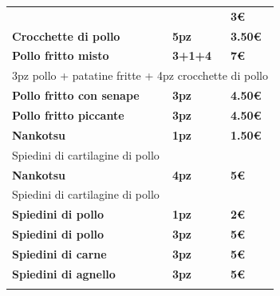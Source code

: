 \documentclass[hidelinks,10pt,a4paper]{article}
\newcommand{\mybox}[1]{
		\colorbox{square}{
		\begin{minipage}{0.97\linewidth}
			#1
		\end{minipage}
	}
}
\newcommand{\entryThreeDesc}[4]{
{\vspace*{-0.5mm}\textbf{\small{#1}}}&{\vspace*{-0.5mm}\textbf{\small{#3}}}&{\vspace*{-0.5mm}\textbf{\small{#4}}}\\
 \multicolumn{3}{l}{\textcolor{desc}{\footnotesize{#2}}} \\
}
\newcommand{\entryThreeSimple}[3]{
	{\textbf{\small{#1}}}&{\textbf{\small{#2}}}&{\textbf{\small{#3}}}\\
}
\begin{document}
\begin{landscape}
\begin{tabularx}{\linewidth}{XXX}
{			\mybox{
				\begin{tabular*}{\linewidth}{ l l l }
				\entryThreeSimple{Patatine fritte}{\hspace*{29mm}}{\hspace*{9mm}3€}
				\entryThreeSimple{Crocchette di pollo}{\hspace*{20mm}5pz}{\hspace*{9mm}3.50€}
				\entryThreeDesc{Pollo fritto misto }{3pz pollo + patatine fritte + 4pz crocchette di pollo}{\hspace*{20mm}3+1+4}{\hspace*{9mm}7€}
				\entryThreeSimple{Pollo fritto con senape}{\hspace*{5mm}{\Large\chili}\hspace*{10.5mm}3pz}{\hspace*{9mm}4.50€}
				\entryThreeSimple{Pollo fritto piccante}{\hspace*{5mm}{\Large\chili\chili}\hspace*{6mm}3pz}{\hspace*{9mm}4.50€}
				\entryThreeDesc{Nankotsu}{Spiedini di cartilagine di pollo}{\hspace*{5mm}{\Large\chili}\hspace*{10.5mm}1pz}{\hspace*{9mm}1.50€}
				\entryThreeDesc{Nankotsu}{Spiedini di cartilagine di pollo}{\hspace*{5mm}{\Large\chili}\hspace*{10.5mm}4pz}{\hspace*{9mm}5€}
				\entryThreeSimple{Spiedini di pollo}{\hspace*{5mm}{\Large\chili}\hspace*{10.5mm}1pz}{\hspace*{9mm}2€}
				\entryThreeSimple{Spiedini di pollo}{\hspace*{5mm}{\Large\chili}\hspace*{10.5mm}3pz}{\hspace*{9mm}5€}
				\entryThreeSimple{Spiedini di carne}{\hspace*{5mm}{\Large\chili}\hspace*{10.5mm}3pz}{\hspace*{9mm}5€}
				\entryThreeSimple{Spiedini di agnello}{\hspace*{5mm}{\Large\chili}\hspace*{10.5mm}3pz}{\hspace*{9mm}5€}
				\end{tabular*}
			}
			
}
\end{tabularx}
\end{landscape}
\end{document}
